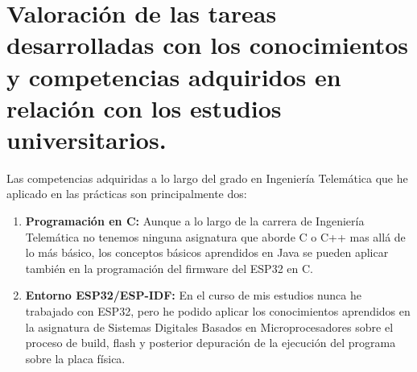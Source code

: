 \documentclass[a4paper,11pt]{article}
\begin{document}
\section{Valoración de las tareas desarrolladas con los conocimientos y competencias adquiridos en relación con los estudios universitarios.}
Las competencias adquiridas a lo largo del grado en Ingeniería Telemática que he aplicado en las prácticas son principalmente dos:
\begin{enumerate}
	\item \textbf{Programación en C: } Aunque a lo largo de la carrera de Ingeniería Telemática no tenemos ninguna asignatura que aborde C o C++ mas allá de lo más básico, los conceptos básicos aprendidos en Java se pueden aplicar también en la programación del firmware del ESP32 en C.
	\item \textbf{Entorno ESP32/ESP-IDF: } En el curso de mis estudios nunca he trabajado con ESP32, pero he podido aplicar los conocimientos aprendidos en la asignatura de Sistemas Digitales Basados en Microprocesadores sobre el proceso de build, flash y posterior depuración de la ejecución del programa sobre la placa física.   
\end{enumerate}
\end{document}
